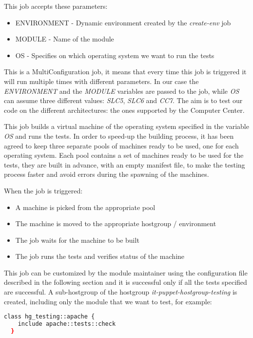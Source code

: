 This job accepts these parameters:

\begin{itemize}
  \item ENVIRONMENT - Dynamic environment created by the \textit{create-env} job
  \item MODULE - Name of the module
  \item OS - Specifies on which operating system we want to run the tests
\end{itemize}

This is a MultiConfiguration job, it means that every time this job is
triggered it will run multiple times with different parameters. In our
case the \textit{ENVIRONMENT} and the \textit{MODULE} variables are passed
to the job, while \textit{OS} can assume three different values:
\textit{SLC5}, \textit{SLC6} and \textit{CC7}. The aim is to test our code
on the different architectures: the ones supported by the Computer
Center.

This job builds a virtual machine of the operating system specified in the
variable \textit{OS} and runs the tests. In order to speed-up the building
process, it has been agreed to keep three separate pools of machines ready
to be used, one for each operating system. Each pool contains a set of
machines ready to be used for the tests, they are built in advance, with
an empty manifest file, to make the testing process faster and avoid
errors during the spawning of the machines.

When the job is triggered:

\begin{itemize}
  \item A machine is picked from the appropriate pool
  \item The machine is moved to the appropriate hostgroup / environment
  \item The job waits for the machine to be built
  \item The job runs the tests and verifies status of the machine
\end{itemize}

This job can be customized by the module maintainer using the
configuration file described in the following section and it is successful
only if all the tests specified are successful. A sub-hostgroup of the
hostgroup \textit{it-puppet-hostgroup-testing} is created, including only
the module that we want to test, for example: \newline{}

\begin{lstlisting}[language=bash, frame=single]
  class hg_testing::apache { 
    include apache::tests::check
  }
\end{lstlisting}

